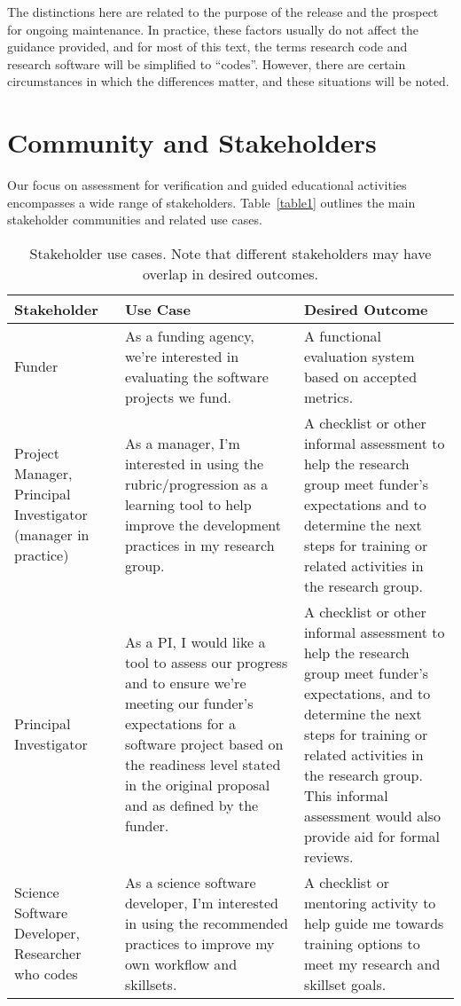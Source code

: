\documentclass{article}
\begin{document}
The distinctions here are related to the purpose of the release and the prospect for ongoing maintenance. In practice, these factors usually do not affect the guidance provided, and for most of this text, the terms research code and research software will be simplified to “codes”. However, there are certain circumstances in which the differences matter, and these situations will be noted.

\section{Community and Stakeholders}
Our focus on assessment for verification and guided educational activities encompasses a wide range of stakeholders. Table~\ref{table1} outlines the main stakeholder communities and related use cases.
\FloatBarrier\clearpage
\begin{table}[!hbp]
\caption{Stakeholder use cases. Note that different stakeholders may have overlap in desired outcomes.}
\centering
\begin{tabularx}{\textwidth}{p{3cm}XX}
\hline
\textbf{Stakeholder} & \textbf{Use Case} & \textbf{Desired Outcome} \\ \hline
Funder & As a funding agency, we're interested in evaluating the software projects we fund. & A functional evaluation system based on accepted metrics. \\ \hline
Project Manager, Principal Investigator (manager in practice) & As a manager, I’m interested in using the rubric/progression as a learning tool to help improve the development practices in my research group. & A checklist or other informal assessment to help the research group meet funder's expectations and to determine the next steps for training or related activities in the research group. \\ \hline
Principal Investigator & As a PI, I would like a tool to assess our progress and to ensure we’re meeting our funder’s expectations for a software project based on the readiness level stated in the original proposal and as defined by the funder. & A checklist or other informal assessment to help the research group meet funder's expectations, and to determine the next steps for training or related activities in the research group. This informal assessment would also provide aid for formal reviews. \\ \hline
Science Software Developer, Researcher who codes & As a science software developer, I’m interested in using the recommended practices to improve my own workflow and skillsets. & A checklist or mentoring activity to help guide me towards training options to meet my research and skillset goals. \\ \hline

\end{tabularx}
\end{table}
\end{document}
